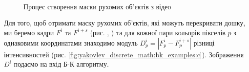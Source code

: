 \begin{figure}[H]
	\centering
	\\
	\\
	\\
	\caption{Процес створення маски рухомих об'єктів з відео \cite{video:mmzi:yakovlev_discrete_math}
		\label{fig:yakovlev_discrete_math:bk_examples}
	}
\end{figure}

Для того, щоб отримати маску рухомих об'єктів, які можуть перекривати дошку, ми
беремо кадри \(F^{i}\) та \(F^{i + s}\) (рис.
,
) та для
кожної пари кольорів пікселів \(p\) з однаковими координатами знаходимо
модуль \(D_{p}^{i} = \left| F_{p}^{i} - F_{p}^{i + s} \right|\) різниці
інтенсивностей (рис. \ref{fig:yakovlev_discrete_math:bk_examples:c}). Зображення \(D^{i}\) подаємо на вхід
Б-К алгоритму.

